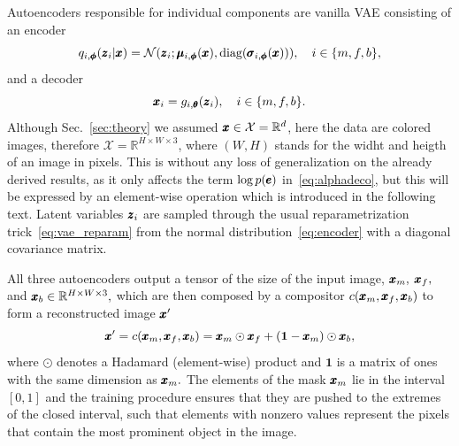 Autoencoders responsible for individual components are vanilla VAE consisting of an encoder
\begin{equation} \label{eq:encoder}
    q_{i,\vc{\phi}}(\vc{z}_i \vert \vc{x}) = \mathcal{N} \left(\vc{z}_i; \vc{\mu}_{i,\vc{\phi}}(\vc{x}), \text{diag}(\vc{\sigma}_{i,\vc{\phi}}(\vc{x})) \right), \quad i \in \lbrace m, f, b \rbrace,
\end{equation}
 and a decoder 
\begin{equation} \label{eq:decoder}
    \pmb{{x}}_i = g_{i,\pmb{{\theta}}} (\pmb{{z}}_i),\quad i \in \lbrace m, f, b \rbrace.
\end{equation}
Although Sec.~\ref{sec:theory} we assumed $\pmb{{x}} \in \mathcal{X} = \mathbb{R}^d$, here the data are colored images, therefore $\mathcal{X} = \mathbb{R}^{H \times W \times 3}$, where $(W,H)$ stands for the widht and heigth of an image in pixels. This is without any loss of generalization on the already derived results, as it only affects the term $\log p(\pmb{{e}})$ in~\eqref{eq:alphadeco}, but this will be expressed by an element-wise operation which is introduced in the following text. Latent variables $\pmb{{z}}_i$ are sampled through the usual reparametrization trick~\eqref{eq:vae_reparam} from the normal distribution~\eqref{eq:encoder} with a diagonal covariance matrix.

All three autoencoders output a tensor of the size of the input image, $\pmb{{x}}_m,$ $\pmb{{x}}_f,$ and $\pmb{{x}}_b \in \mathbb{R}^{H \times W \times 3},$ which are then composed by a compositor $c(\pmb{{x}}_m,\pmb{{x}}_f,\pmb{{x}}_b)$ to form a reconstructed image $\pmb{{x}}'$
\begin{equation}
    \pmb{{x}}' = c(\pmb{{x}}_m,\pmb{{x}}_f,\pmb{{x}}_b) = \pmb{{x}}_m \odot \pmb{{x}}_f + (\mathbf{1} - \pmb{{x}}_m) \odot \pmb{{x}}_b, \label{eq:composition}
\end{equation}
where $\odot$ denotes a Hadamard (element-wise) product and $\mathbf{1}$ is a matrix of ones with the same dimension as $\pmb{{x}}_m.$ The elements of the mask $\pmb{{x}}_m$ lie in the interval $[0,1]$ and the training procedure ensures that they are pushed to the extremes of the closed interval, such that elements with nonzero values represent the pixels that contain the most prominent object in the image. 

